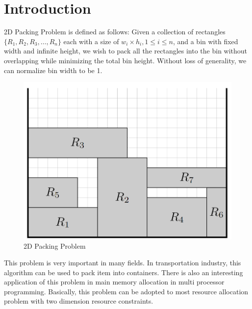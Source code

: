 \documentclass[sigplan,screen,nonacm]{acmart}\settopmatter{printfolios=true,printccs=false,printacmref=false}
\begin{document}
\maketitle

\section{Introduction}
2D Packing Problem is defined as follows: Given a collection of rectangles $\{R_1,R_2,R_3,\dots,R_n\}$ each with a size of $w_i\times h_i, 1\leq i\leq n$, and a bin with fixed width and infinite height, we wish to pack all the rectangles into the bin without overlapping while minimizing the total bin height\cite{baker1980orthogonal}. Without loss of generality, we can normalize bin width to be 1.\par
\begin{figure}[htbp]
  \centering
  \includegraphics[scale=0.5]{2dpacking}
  \caption{2D Packing Problem}
  \label{fig:2dpacking}
\end{figure}
This problem is very important in many fields. In transportation industry, this algorithm can be used to pack item into containers. There is also an interesting application of this problem in main memory allocation in multi processor programming. Basically, this problem can be adopted to most resource allocation problem with two dimension resource constraints.\par
\end{document}
